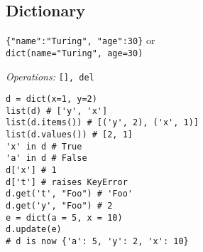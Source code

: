 \subsection{Dictionary}
\texttt{\{"name":"Turing", "age":30\}} or \\
\texttt{dict(name="Turing", age=30)}

\textit{Operations:} \texttt{[], del}
\begin{lstlisting}
d = dict(x=1, y=2)
list(d) # ['y', 'x']
list(d.items()) # [('y', 2), ('x', 1)]
list(d.values()) # [2, 1]
'x' in d # True
'a' in d # False
d['x'] # 1
d['t'] # raises KeyError
d.get('t', "Foo") # 'Foo'
d.get('y', "Foo") # 2
e = dict(a = 5, x = 10)
d.update(e) 
# d is now {'a': 5, 'y': 2, 'x': 10}
\end{lstlisting}

